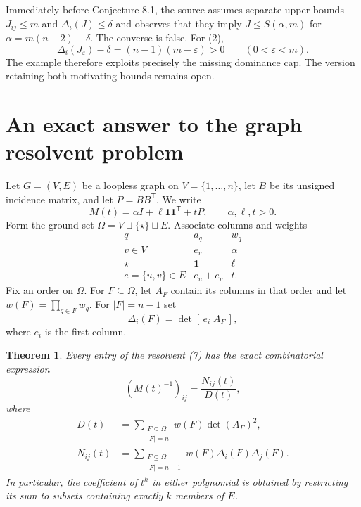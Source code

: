 \documentclass[10pt]{article}
\newtheorem{theorem}{Theorem}
\newcommand{\one}{\mathbf 1}
\begin{document}
Immediately before Conjecture 8.1, the source assumes separate upper bounds
$J_{ij}\le m$ and $\Delta_i(J)\le\delta$ and observes that they imply
$J\le S(\alpha,m)$ for $\alpha=m(n-2)+\delta$.  The converse is false.  For
(2),
\[
 \Delta_i(J_\varepsilon)-\delta=(n-1)(m-\varepsilon)>0
 \qquad(0<\varepsilon<m).                                 \tag{6}
\]
The example therefore exploits precisely the missing dominance cap.  The
version retaining both motivating bounds remains open.

\section*{An exact answer to the graph resolvent problem}

Let $G=(V,E)$ be a loopless graph on $V=\{1,\ldots,n\}$, let $B$ be its
unsigned incidence matrix, and let $P=BB^{\mathsf T}$.  We write
\[
                   M(t)=\alpha I+\ell\one\one^{\mathsf T}+tP,
                   \qquad \alpha,\ell,t>0.                 \tag{7}
\]
Form the ground set $\Omega=V\sqcup\{\star\}\sqcup E$.  Associate columns
and weights
\[
\begin{array}{c|c|c}
q& a_q&w_q\\ \hline
v\in V&e_v&\alpha\\
\star&\one&\ell\\
e=\{u,v\}\in E&e_u+e_v&t.
\end{array}                                                \tag{8}
\]
Fix an order on $\Omega$.  For $F\subseteq\Omega$, let $A_F$ contain its
columns in that order and let $w(F)=\prod_{q\in F}w_q$.  For $|F|=n-1$ set
\[
                  \Delta_i(F)=\det[\,e_i\; A_F\,],         \tag{9}
\]
where $e_i$ is the first column.

\begin{theorem}\label{thm:resolvent}
Every entry of the resolvent (7) has the exact combinatorial expression
\[
 (M(t)^{-1})_{ij}=\frac{N_{ij}(t)}{D(t)},                  \tag{10}
\]
where
\begin{align}
 D(t)&=\sum_{\substack{F\subseteq\Omega\\|F|=n}}
              w(F)\det(A_F)^2,                            \tag{11}\\
 N_{ij}(t)&=\sum_{\substack{F\subseteq\Omega\\|F|=n-1}}
              w(F)\Delta_i(F)\Delta_j(F).                 \tag{12}
\end{align}
In particular, the coefficient of $t^k$ in either polynomial is obtained by
restricting its sum to subsets containing exactly $k$ members of $E$.
\end{theorem}
\end{document}
